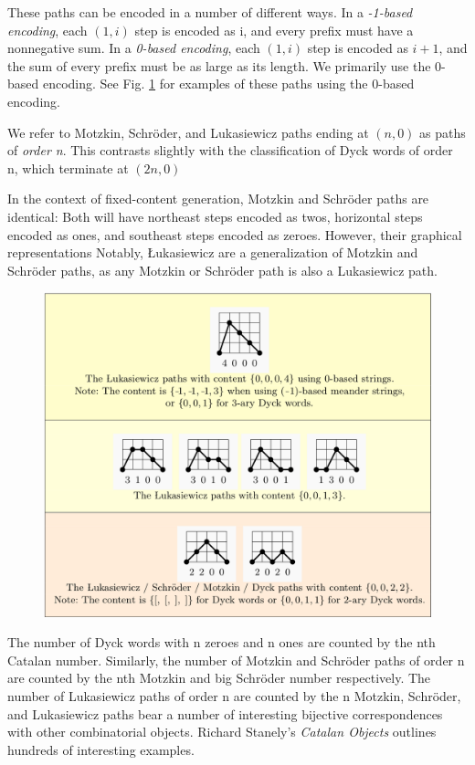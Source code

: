 These paths can be encoded in a number of different ways.  In a \emph{-1-based encoding}, each $(1,i)$ step is encoded as i, and every prefix must have a nonnegative sum.  In a \emph{0-based encoding}, each $(1,i)$ step is encoded as $i+1$, and the sum of every prefix must be as large as its length. We primarily use the 0-based encoding. See Fig. \ref{paths}  for examples of these paths using the 0-based encoding.

We refer to Motzkin, Schröder, and Lukasiewicz paths ending at $(n,0)$ as paths of \emph{order n}.  This contrasts slightly with the classification of Dyck words of order n, which terminate at $(2n,0)$

In the context of fixed-content generation, Motzkin and Schröder paths are identical:  Both will have northeast steps encoded as twos, horizontal steps encoded as ones, and southeast steps encoded as zeroes.  However, their graphical representations Notably, Łukasiewicz are a generalization of Motzkin and Schröder paths, as any Motzkin or Schröder path is also a Lukasiewicz path.

\bigskip

\begin{figure}[]
	\centering
	\includegraphics[width = .95 \textwidth]{paths.png}
	\caption{}
	\label{paths}
\end{figure}


The number of Dyck words with n zeroes and n ones are counted by the nth Catalan number.  Similarly, the number of Motzkin and Schröder paths of order n are counted by the nth Motzkin and big Schröder number respectively. The number of Lukasiewicz paths of order n are counted by the n
Motzkin, Schröder, and Lukasiewicz paths bear a number of interesting bijective correspondences with other combinatorial objects. Richard Stanely's \emph{Catalan Objects} outlines hundreds of interesting examples.  


